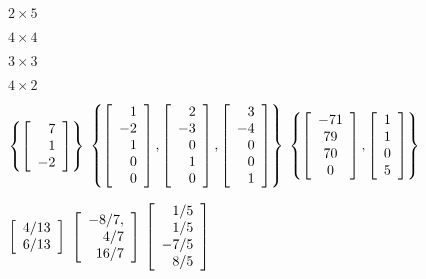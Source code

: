 
\begin{enumerate}[!HW!, start=1]
\begin{multicols}{4}
\item $2\times 5$ %
\item $4\times 4$ %
\item $3\times 3$ %
\item $4\times 2$ %
\end{multicols}
\begin{multicols}{3}
\itemspade $\left\{\vr{7\\1\\-2}\right\}$
\itemspade $\left\{\vr{1\\-2\\1\\0\\0}, \vr{2\\-3\\0\\1\\0},\vr{3\\-4\\0\\0\\1}\right\}$
\itemspade $\left\{\mtx{c}{-71\\79\\70\\0}, \vr{1\\1\\0\\5}\right\}$
\end{multicols}
\begin{multicols}{3}
\itemspade $\vr{4/13\\6/13}$
\itemspade $\vr{-8/7,\\4/7\\16/7}$
\itemspade $\vr{1/5\\1/5\\-7/5\\8/5}$
\end{multicols}
\end{enumerate}